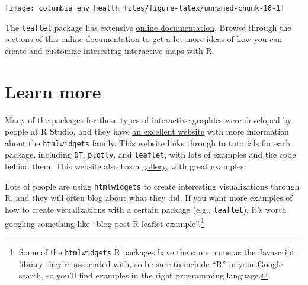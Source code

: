 \documentclass[]{tufte-book}
\newenvironment{Shaded}{}{}
\newcommand{\DataTypeTok}[1]{\textcolor[rgb]{0.56,0.13,0.00}{#1}}
\newcommand{\DecValTok}[1]{\textcolor[rgb]{0.25,0.63,0.44}{#1}}
\newcommand{\FloatTok}[1]{\textcolor[rgb]{0.25,0.63,0.44}{#1}}
\newcommand{\KeywordTok}[1]{\textcolor[rgb]{0.00,0.44,0.13}{\textbf{#1}}}
\newcommand{\NormalTok}[1]{#1}
\newcommand{\OperatorTok}[1]{\textcolor[rgb]{0.40,0.40,0.40}{#1}}
\newcommand{\StringTok}[1]{\textcolor[rgb]{0.25,0.44,0.63}{#1}}
\begin{document}
\begin{Shaded}
\end{Shaded}

\texttt{[image: columbia\_env\_health\_files/figure-latex/unnamed-chunk-16-1]}

The \texttt{leaflet} package has extensive \href{https://rstudio.github.io/leaflet/}{online documentation}.
Browse through the sections of this online documentation to get a lot more ideas of how you can
create and customize interesting interactive maps with R.

\hypertarget{learn-more-2}{%
\section{Learn more}\label{learn-more-2}}

Many of the packages for these types of interactive graphics were developed by people
at R Studio, and they have \href{https://www.htmlwidgets.org/}{an excellent website}
with more information about the
\texttt{htmlwidgets} family. This website links through to tutorials for each package, including
\texttt{DT}, \texttt{plotly}, and \texttt{leaflet}, with lots of examples and the code behind them.
This website also has a \href{http://gallery.htmlwidgets.org/}{gallery}, with great examples.

Lots of people are using \texttt{htmlwidgets} to create interesting visualizations through R,
and they will often blog about what they did. If you want more examples of how to
create visualizations with a certain package (e.g., \texttt{leaflet}), it's worth googling
something like ``blog post R leaflet example''.\footnote{Some of the \texttt{htmlwidgets} R packages
  have the same name as the Javascript library they're associated with, so be sure to
  include ``R'' in your Google search, so you'll find examples in the right programming
  language.}
\end{document}
